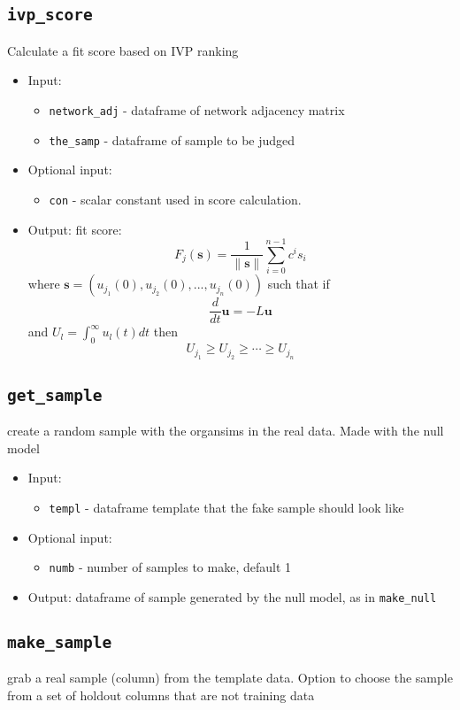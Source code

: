 \documentclass[10pt]{article}
\theoremstyle{definition}
\numberwithin{theorem}{section}
\numberwithin{definition}{section}
\numberwithin{lemma}{section}
\numberwithin{corollary}{section}
\numberwithin{clm}{section}
\numberwithin{rmk}{section}
\renewcommand{\b}{\bm}
\begin{document}
\cprotect \subsection{\verb|ivp_score|}
Calculate a fit score based on IVP ranking
\begin{itemize}
	\item Input: 
	\begin{itemize}
		\item \verb|network_adj| - dataframe of network adjacency matrix
		\item \verb|the_samp| - dataframe of sample to be judged
	\end{itemize}
	\item Optional input:
	\begin{itemize}
		\item \verb|con| - scalar constant used in score calculation.
	\end{itemize}
	\item Output: fit score:
\[
F_j(\b{s}) =\frac{1}{\|\b{s}\|} \sum_{i=0}^{n-1} c^i s_i
\]
where $\b{s} = (u_{j_1}(0),u_{j_2}(0),...,u_{j_n}(0))$ such that if 
\[
\frac{d}{dt}\b{u} = -L\b{u}
\]
and $U_l = \int_0^{\infty} u_l(t) dt$ then
\[
U_{j_1} \geq U_{j_2} \geq \cdots \geq U_{j_n}
\]
\end{itemize}


\cprotect \subsection{\verb|get_sample|}
create a random sample with the organsims in the real data. Made with the null model
\begin{itemize}
	\item Input: 
	\begin{itemize}
		\item \verb|templ| - dataframe template that the fake sample should look like
	\end{itemize}
	\item Optional input:
	\begin{itemize}
		\item \verb|numb| - number of samples to make, default 1
	\end{itemize}
	\item Output: dataframe of sample generated by the null model, as in \verb|make_null|
\end{itemize}

\cprotect \subsection{\verb|make_sample|}
grab a real sample (column) from the template data. Option to choose the sample from
a set of holdout columns that are not training data
\end{document}
